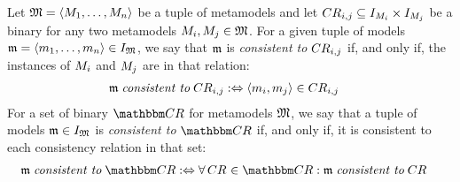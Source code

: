 \begin{definition} 
    \label{def:modellevelconsistency}
    Let $\metamodeltuple{M} =  \tupled{\metamodelsequence{M}{n}}$ be a tuple of metamodels and let $\consistencyrelation{CR}{i,j} \subseteq \metamodelinstanceset{M}{i} \times \metamodelinstanceset{M}{j}$ be a binary \modellevelconsistencyrelation for any two metamodels $\metamodel{M}{i}, \metamodel{M}{j} \in \metamodeltuple{M}$. %
    For a given tuple of models $\modeltuple{m} = \tupled{\model{m}{1}, \dots, \model{m}{n}} \in \metamodeltupleinstanceset{M}{}%
    $, we say that $\modeltuple{m}$ is \emph{consistent to} $\consistencyrelation{CR}{i,j}$ if, and only if, the instances of $\metamodel{M}{i}$ and $\metamodel{M}{j}$ are in that relation:
    \begin{align*} 
        &
        \modeltuple{m} %
        \consistenttomath \consistencyrelation{CR}{i,j} \equivalentperdefinition %
        \tupled{\model{m}{i},\model{m}{j}} \in \consistencyrelation{CR}{i,j}
    \end{align*}
    For a set of binary \modellevelconsistencyrelations $\consistencyrelationset{CR}$ for metamodels $\metamodeltuple{M}$, we say that a tuple of models $\modeltuple{m} \in \metamodeltupleinstanceset{M}{}$ is \emph{consistent to} $\consistencyrelationset{CR}$ if, and only if, it is consistent to each consistency relation in that set:
    \begin{align*} 
        &
        \modeltuple{m} \consistenttomath \consistencyrelationset{CR} \equivalentperdefinition %
        \forall \consistencyrelation{CR}{} \in \consistencyrelationset{CR} : \modeltuple{m} \consistenttomath \consistencyrelation{CR}{}
    \end{align*}
\end{definition}

